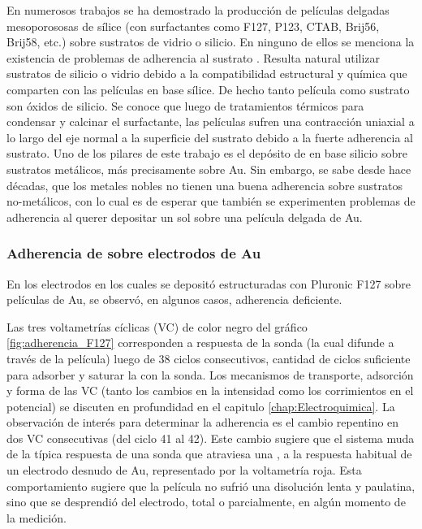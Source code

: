 		 En numerosos trabajos se ha demostrado la producción de películas delgadas mesoporososas de sílice (con surfactantes como F127, P123, CTAB, Brij56, Brij58, etc.) sobre sustratos de vidrio o silicio. En ninguno de ellos se menciona la existencia de problemas de adherencia al sustrato \cite{Angelome2008,Fuertes2010,Violi2015}. Resulta natural utilizar sustratos de silicio o vidrio debido a la compatibilidad estructural y química que comparten con las películas en base sílice. De hecho tanto película como sustrato son óxidos de silicio. Se conoce que luego de tratamientos térmicos para condensar y calcinar el surfactante, las películas sufren una contracción uniaxial a lo largo del eje normal a la superficie del sustrato debido a la fuerte adherencia al sustrato.\cite{Grosso2004,Soler-Illia2012,Chougnet2005} Uno de los pilares de este trabajo es el depósito de \pdm\space en base silicio sobre sustratos metálicos, más precisamente sobre Au. Sin embargo, se sabe desde hace décadas, que los metales nobles no tienen una buena adherencia sobre sustratos no-metálicos\cite{Kern1990,Hieber1976}, con lo cual es de esperar que también se experimenten problemas de adherencia al querer depositar un sol sobre una película delgada de Au. \cite{Meyer2004,Nugen2009,nasa1973}

		\subsubsection{Adherencia de \pdm\space sobre electrodos de Au}

			En los electrodos en los cuales se depositó \pdm\space estructuradas con Pluronic F127 sobre películas de Au, se observó, en algunos casos, adherencia deficiente. 
			
			Las tres voltametrías cíclicas (VC) de color negro del gráfico \ref{fig:adherencia_F127} corresponden a respuesta de la sonda \aminorutenio (la cual difunde a través de la película) luego de 38 ciclos consecutivos, cantidad de ciclos suficiente para adsorber y saturar la \pdm\space con la sonda. Los mecanismos de transporte, adsorción y forma de las VC (tanto los cambios en la intensidad como los corrimientos en el potencial) se discuten en profundidad en el capitulo \ref{chap:Electroquimica}. La observación de interés para determinar la adherencia es el cambio repentino en dos VC consecutivas (del ciclo 41 al 42). Este cambio sugiere que el sistema muda de la típica respuesta de una sonda que atraviesa una \pdm, a la respuesta habitual de un electrodo desnudo de Au, representado por la voltametría roja. Esta comportamiento sugiere que la película no sufrió una disolución lenta y paulatina, sino que se desprendió del electrodo, total o parcialmente, en algún momento de la medición.
			
